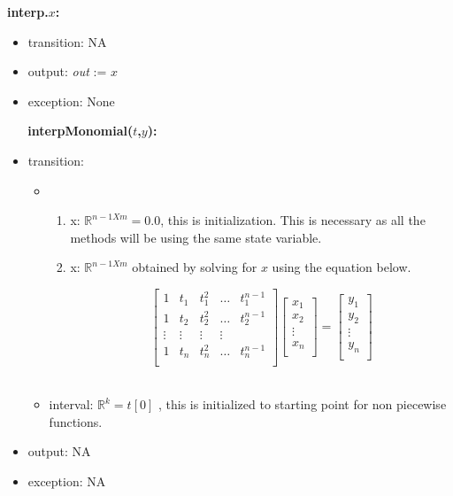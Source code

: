 \documentclass[12pt, titlepage]{article}
\begin{document}
\noindent \textbf{interp.$x$:}
\begin{itemize}
	\item transition: NA	
	\item output: \textit{out} := $x$
	\item exception: None
\end{itemize}
~\newline
~\newline
\noindent \textbf{interpMonomial($t$,$y$):}
\begin{itemize}
\item transition: 
\begin{itemize}
	\item 
	\begin{enumerate}
	\item x: $\mathbb{R}^{n-1 X m} = 0.0 $, this is initialization. This is 
	necessary as all the methods will be using the same state variable.
	
	\item x: $\mathbb{R}^{n-1 X m}$ obtained by solving for $x$ using the 
	equation below.
	
	\begin{equation*}
	\begin{bmatrix}
	1 & t_{1} & t_{1} ^2 & \dots & t_{1} ^{n-1} \\
	1 & t_{2} & t_{2} ^2 & \dots & t_{2} ^{n-1} \\
	\vdots & \vdots & \vdots & \vdots \\
	1 & t_{n} & t_{n} ^2 & \dots & t_{n} ^{n-1} \\
	\end{bmatrix}
	\begin{bmatrix}
	x_1  \\
	x_2 \\
	\vdots \\
	x_n \\
	\end{bmatrix} = 
	\begin{bmatrix}
	y_1  \\
	y_2 \\
	\vdots \\
	y_n \\
	\end{bmatrix}
	\end{equation*}\\ 
	\end{enumerate}
	\item interval: $\mathbb{R}^{k} = t[0] $ , this is initialized to starting 
	point for non piecewise functions.
\end{itemize}
  
\item output: NA
 
\item exception: NA
\end{itemize}
\end{document}
